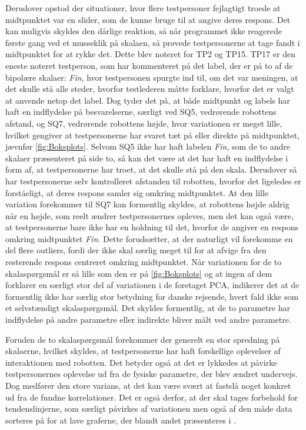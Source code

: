 Derudover opstod der situationer, hvor flere testpersoner fejlagtigt troede at midtpunktet var en slider, som de kunne bruge til at angive deres respons. Det kan muligvis skyldes den dårlige reaktion, så når programmet ikke reagerede første gang ved et musseklik på skalaen, så prøvede testpersonerne at tage fandt i midtpunktet for at rykke det. Dette blev noteret for TP2 og TP15.\blankline 
%
TP17 er den eneste noteret testperson, som har kommenteret på det label, der er på to af de bipolære skalaer: \textit{Fin}, hvor testpersonen spurgte ind til, om det var meningen, at det skulle stå alle steder, hvorfor testlederen måtte forklare, hvorfor det er valgt at anvende netop det label. Dog tyder det på, at både midtpunkt og labels har haft en indflydelse på besvarelserne, særligt ved SQ5, vedrørende robottens afstand, og SQ7, vedrørende robottens højde, hvor variationen er meget lille, hvilket gengiver at testpersonerne har svaret tæt på eller direkte på midtpunktet, jævnfør \autoref{fig:Boksplots}. Selvom SQ5 ikke har haft labelen \textit{Fin}, som de to andre skalaer præsenteret på side to, så kan det være at det har haft en indflydelse i form af, at testpersonerne har troet, at det skulle stå på den skala. Derudover så har testpersonerne selv kontrolleret afstanden til robotten, hvorfor det ligeledes er forståeligt, at deres respons samler sig omkring midtpunktet. At den lille variation forekommer til SQ7 kan formentlig skyldes, at robottens højde aldrig når en højde, som reelt ændrer testpersonernes opleves, men det kan også være, at testpersonerne bare ikke har en holdning til det, hvorfor de angiver en respons omkring midtpunktet \textit{Fin}. Dette forudsætter, at der naturligt vil forekomme en del flere outliers, fordi der ikke skal særlig meget til for at afvige fra den resterende respons centreret omkring midtpunktet. Når variationen for de to skalaspørgsmål er så lille som den er på \autoref{fig:Boksplots} og at ingen af dem forklarer en særligt stor del af variationen i de foretaget PCA, indikerer det at de formentlig ikke har særlig stor betydning for danske rejsende, hvert fald ikke som et selvstændigt skalaspørgsmål. Det skyldes formentlig, at de to parametre har indflydelse på andre parametre eller indirekte bliver målt ved andre parametre. 

Foruden de to skalaspørgsmål forekommer der generelt en stor spredning på skalaerne, hvilket skyldes, at testpersonerne har haft forskellige oplevelser af interaktionen med robotten. Det betyder også at det er lykkedes at påvirke testpersonernes oplevelse ud fra de fysiske parametre, der blev ændret undervejs. Dog medfører den store varians, at det kan være svært at fastslå noget konkret ud fra de fundne korrelationer. Det er også derfor, at der skal tages forbehold for tendenslinjerne, som særligt påvirkes af variationen men også af den måde data sorteres på for at lave graferne, der blandt andet præsenteres i . 
%



